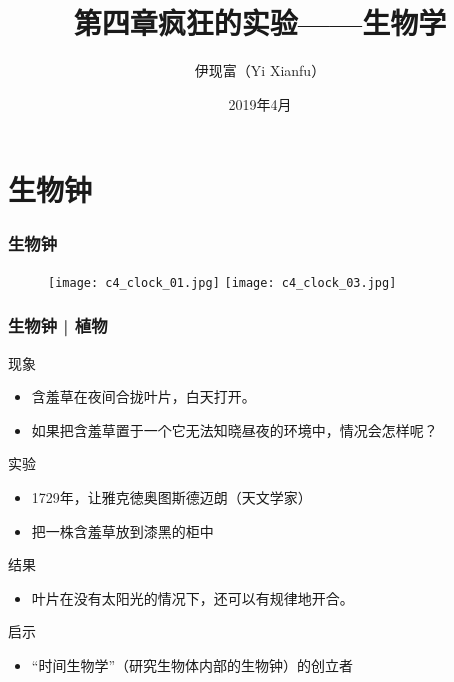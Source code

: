 



\title[生物学]{第四章\quad 疯狂的实验——生物学}
\author[Yixf]{伊现富（Yi Xianfu）}
\date{2019年4月}



\section{生物钟}
\begin{frame}
  \frametitle{生物钟}
  \begin{figure}
    \centering
    \texttt{[image: c4\_clock\_01.jpg]}
    \texttt{[image: c4\_clock\_03.jpg]}
  \end{figure}
\end{frame}

\begin{frame}
  \frametitle{生物钟 | 植物}
  \begin{block}{现象}
    \begin{itemize}
      \item 含羞草在夜间合拢叶片，白天打开。
      \item 如果把含羞草置于一个它无法知晓昼夜的环境中，情况会怎样呢？
    \end{itemize}
  \end{block}
  \pause
  \begin{block}{实验}
    \begin{itemize}
      \item 1729年，让\textbullet 雅克\textbullet 徳奥图斯\textbullet 德迈朗（天文学家）
      \item 把一株含羞草放到漆黑的柜中
    \end{itemize}
  \end{block}
  \pause
  \begin{block}{结果}
    \begin{itemize}
      \item 叶片在没有太阳光的情况下，还可以有规律地开合。
    \end{itemize}
  \end{block}
  \pause
  \begin{block}{启示}
    \begin{itemize}
      \item “时间生物学”（研究生物体内部的生物钟）的创立者
    \end{itemize}
  \end{block}
\end{frame}

